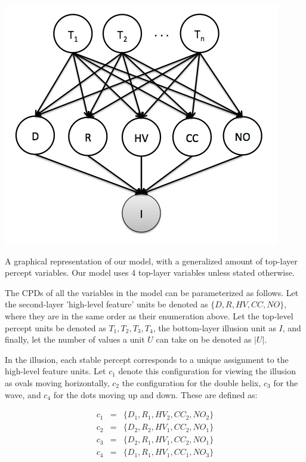 \documentclass{article} %
\begin{document}
\begin{center}
\includegraphics[scale=0.51]{graphical_model}
\end{center}
\small
A graphical representation of our model, with a generalized amount of top-layer percept variables. Our model uses 4 top-layer variables unless stated otherwise.
\normalsize


The CPDs of all the variables in the model can be parameterized as follows. Let the second-layer 'high-level feature' units be denoted as $\{D, R, HV, CC, NO\}$, where they are in the same order as their enumeration above. Let the top-level percept units be denoted as $T_1, T_2, T_3, T_4$, the bottom-layer illusion unit as $I$, and finally, let the number of values a unit $U$ can take on be denoted as $|U|$.  

In the illusion, each stable percept corresponds to a unique assignment to the high-level feature units. Let $c_1$ denote this configuration for viewing the illusion as ovals moving horizontally, $c_2$ the configuration for the double helix, $c_3$ for the wave, and $c_4$ for the dots moving up and down. These are defined as:

\begin{eqnarray*}
c_1 &=& \{D_1,R_1,HV_2,CC_2,NO_2 \} \\
c_2 &=& \{D_2,R_2,HV_1,CC_2,NO_1 \} \\
c_3 &=& \{D_2,R_1,HV_1,CC_2,NO_1 \} \\
c_4 &=& \{D_1,R_1,HV_1,CC_1,NO_3 \} 
\end{eqnarray*}
\end{document}
